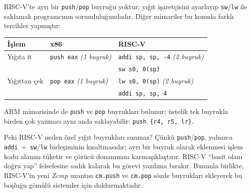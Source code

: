 \begin{karsilastirma}
RISC-V'te ayrı bir \texttt{push}/\texttt{pop} buyruğu yoktur; yığıt işaretçisini ayarlayıp \texttt{sw}/\texttt{lw} ile saklamak programcının sorumluluğundadır. Diğer mimariler bu konuda farklı tercihler yapmıştır:

\begin{center}
\small
\begin{tabular}{lll}
\toprule
İşlem & x86 & RISC-V \\
\midrule
Yığıta it & \texttt{push eax} \emph{(1 buyruk)} & \texttt{addi sp, sp, -4} \emph{(2 buyruk)} \\
 & & \texttt{sw s0, 0(sp)} \\
Yığıttan çek & \texttt{pop eax} \emph{(1 buyruk)} & \texttt{lw s0, 0(sp)} \emph{(2 buyruk)} \\
 & & \texttt{addi sp, sp, 4} \\
\bottomrule
\end{tabular}
\end{center}

ARM mimarisinde de \texttt{push} ve \texttt{pop} buyrukları bulunur; üstelik tek buyrukla birden çok yazmacı aynı anda saklayabilir: \texttt{push \{r4, r5, lr\}}.

Peki RISC-V neden özel yığıt buyrukları sunmaz? Çünkü \texttt{push}/\texttt{pop}, yalnızca \texttt{addi}~+~\texttt{sw}/\texttt{lw} birleşiminin kısaltmasıdır; ayrı bir buyruk olarak eklenmesi işlem kodu alanını tüketir ve çözücü donanımını karmaşıklaştırır. RISC-V ``basit olanı doğru yap'' felsefesine sadık kalarak bu görevi yazılıma bırakır. Bununla birlikte, RISC-V'in yeni \emph{Zcmp} uzantısı \texttt{cm.push} ve \texttt{cm.pop} sözde buyrukları ekleyerek bu boşluğu gömülü sistemler için doldurmaktadır.
\end{karsilastirma}

